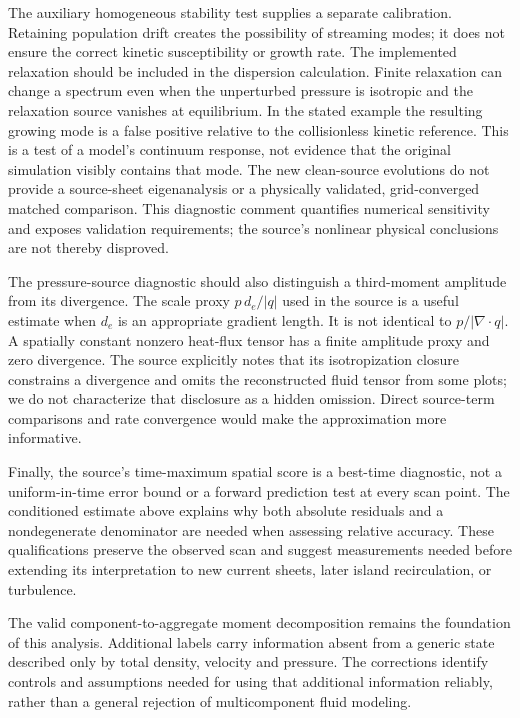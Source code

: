 The auxiliary homogeneous stability test supplies a separate calibration.
Retaining population drift creates the possibility of streaming modes; it
does not ensure the correct kinetic susceptibility or growth rate. The
implemented relaxation should be included in the dispersion calculation.
Finite relaxation can change a spectrum even when the unperturbed pressure
is isotropic and the relaxation source vanishes at equilibrium. In the stated
example the resulting growing mode is a false positive relative to the
collisionless kinetic reference. This is a test of a model's continuum
response, not evidence that the original simulation visibly contains that mode.
The new clean-source evolutions do not provide a source-sheet eigenanalysis
or a physically validated, grid-converged matched comparison. This diagnostic
comment quantifies numerical sensitivity and exposes validation requirements;
the source's nonlinear physical conclusions are not thereby disproved.

The pressure-source diagnostic should also distinguish a third-moment amplitude
from its divergence. The scale proxy $p\,d_e/|q|$ used in the source is a useful
estimate when $d_e$ is an appropriate gradient length. It is not identical to
$p/|\nabla\!\cdot q|$. A spatially constant nonzero heat-flux tensor has a finite
amplitude proxy and zero divergence. The source explicitly notes that its
isotropization closure constrains a divergence and omits the reconstructed
fluid tensor from some plots; we do not characterize that disclosure as a
hidden omission. Direct source-term comparisons and rate convergence would
make the approximation more informative.

Finally, the source's time-maximum spatial score is a best-time diagnostic,
not a uniform-in-time error bound or a forward prediction test at every scan
point. The conditioned estimate above explains why both absolute residuals
and a nondegenerate denominator are needed when assessing relative accuracy.
These qualifications preserve the observed scan and suggest measurements
needed before extending its interpretation to new current sheets, later
island recirculation, or turbulence.

The valid component-to-aggregate moment decomposition remains the foundation
of this analysis. Additional labels carry information absent from a generic
state described only by total density, velocity and pressure. The corrections
identify controls and assumptions needed for using that additional information
reliably, rather than a general rejection of multicomponent fluid modeling.

